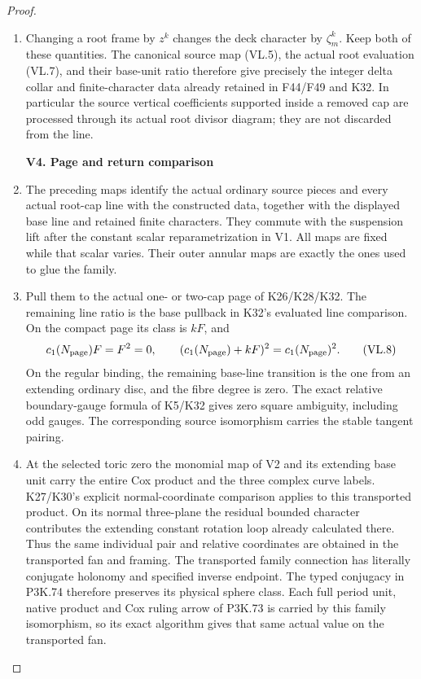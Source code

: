 \begin{proof}
\begin{enumerate}[label=\arabic*.]
\item Changing a root frame by \(z^k\) changes the deck
character by \(\zeta_m^k\). Keep both of these
quantities. The canonical source map (VL.5), the
actual root evaluation (VL.7), and their base-unit
ratio therefore give precisely the integer delta
collar and finite-character data already retained
in F44/F49 and K32. In particular the source
vertical coefficients supported inside a removed
cap are processed through its actual root divisor
diagram; they are not discarded from the line.

\par

\medskip\noindent\textbf{V4. Page and return comparison}

\par\nobreak

\item The preceding maps identify the actual ordinary
source pieces and every actual root-cap line with
the constructed data, together with the displayed
base line and retained finite characters. They
commute with the suspension lift after the constant
scalar reparametrization in V1. All maps are fixed
while that scalar varies. Their outer annular
maps are exactly the ones used to glue the family.

\item Pull them to the actual one- or two-cap page of
K26/K28/K32. The remaining line ratio is the base
pullback in K32's evaluated line comparison. On
the compact page its class is \(kF\), and
\[
 c_1(N_{\rm page})F=F^2=0,\qquad
 (c_1(N_{\rm page})+kF)^2=c_1(N_{\rm page})^2 .
 \tag{VL.8}
\]
On the regular binding, the remaining base-line
transition is the one from an extending ordinary
disc, and the fibre degree is zero. The exact
relative boundary-gauge formula of K5/K32 gives
zero square ambiguity, including odd gauges.
The corresponding source isomorphism carries
the stable tangent pairing.

\item At the selected toric zero the monomial map of V2
and its extending base unit carry the entire Cox
product and the three complex curve labels. K27/K30's
explicit normal-coordinate comparison applies to
this transported product. On its normal three-plane
the residual bounded character contributes the
extending constant rotation loop already calculated
there. Thus the same individual pair and relative
coordinates are obtained in the transported fan
and framing. The transported family connection has literally conjugate holonomy
and specified inverse endpoint. The typed conjugacy in P3K.74
therefore preserves its physical sphere class. Each full period
unit, native product and Cox ruling arrow of P3K.73 is carried by
this family isomorphism, so its exact algorithm gives that same
actual value on the transported fan.


\end{enumerate}
\end{proof}
